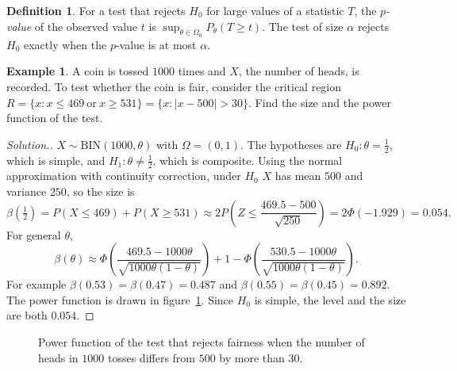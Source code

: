 \documentclass[12pt,a4paper]{report}
\theoremstyle{definition}
\newtheorem{defn}[thm]{Definition}
\newtheorem{exa}[thm]{Example}
\newenvironment{solution}
  {\renewcommand{\qedsymbol}{}\begin{proof}[\textit{Solution}.]}
  {\end{proof}}
\begin{document}
\begin{defn}
\label{def:pvaluesi}
For a test that rejects $H_0$ for large values of a statistic $T$, the
\emph{$p$-value} of the observed value $t$ is $\sup_{\theta\in\Omega_0}P_\theta(T\ge t)$. The
test of size $\alpha$ rejects $H_0$ exactly when the $p$-value is at most $\alpha$.
\end{defn}

\begin{exa}
\label{ex:fourcoin}
A coin is tossed $1000$ times and $X$, the number of heads, is recorded. To test
whether the coin is fair, consider the critical region
$R = \{x : x\le 469\ \text{or}\ x\ge 531\} = \{x : |x - 500|>30\}$. Find the size and
the power function of the test.
\end{exa}

\begin{solution}
$X\sim\text{BIN}(1000, \theta)$ with $\Omega = (0, 1)$. The hypotheses are
$H_0\colon\theta = \frac12$, which is simple, and $H_1\colon\theta\ne\frac12$, which is
composite. Using the normal approximation with continuity correction, under $H_0$
$X$ has mean $500$ and variance $250$, so the size is
\[\beta\left(\tfrac12\right) = P(X\le 469) + P(X\ge 531) \approx 2P\left(Z\le\frac{469.5 - 500}{\sqrt{250}}\right) = 2\Phi(-1.929) = 0.054 .\]
For general $\theta$,
\[\beta(\theta)\approx\Phi\left(\frac{469.5 - 1000\theta}{\sqrt{1000\theta(1 - \theta)}}\right)
+ 1 - \Phi\left(\frac{530.5 - 1000\theta}{\sqrt{1000\theta(1 - \theta)}}\right).\]
For example $\beta(0.53) = \beta(0.47) = 0.487$ and $\beta(0.55) = \beta(0.45) = 0.892$.
The power function is drawn in figure~\ref{fig:coinpower}. Since $H_0$ is simple, the
level and the size are both $0.054$.
\end{solution}

\begin{figure}[H]
\centering
{}
\caption{Power function of the test that rejects fairness when the number of heads in
$1000$ tosses differs from $500$ by more than $30$.}
\label{fig:coinpower}
\end{figure}
\end{document}

